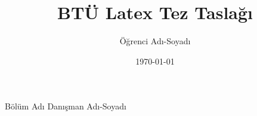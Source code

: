 \documentclass{btu_mdbf_tez}
\title{BTÜ Latex Tez Taslağı}
\author{Öğrenci Adı-Soyadı}
\date{\today}
\begin{document}
	\startthesis

	\innercoverpage
		{Bölüm Adı}
		{Danışman Adı-Soyadı}

	\startcontent
	
	
\end{document}
